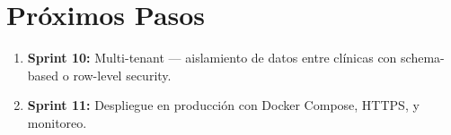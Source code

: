 \documentclass[12pt,a4paper]{article}
\begin{document}
\section{Próximos Pasos}

\begin{enumerate}[leftmargin=*]
    \item \textbf{Sprint 10:} Multi-tenant --- aislamiento de datos
          entre clínicas con schema-based o row-level security.
    \item \textbf{Sprint 11:} Despliegue en producción con Docker
          Compose, HTTPS, y monitoreo.
\end{enumerate}
\end{document}
